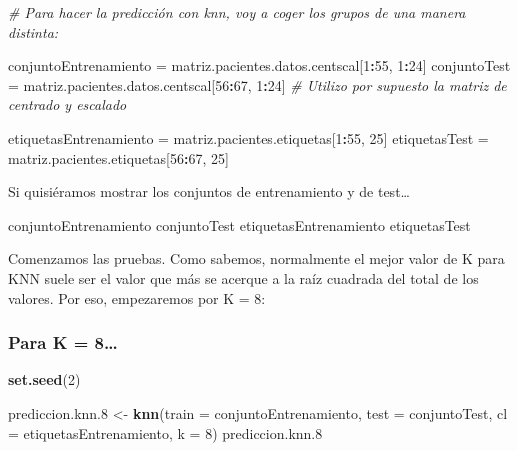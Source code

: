 \documentclass[]{article}
\newenvironment{Shaded}{\begin{snugshade}}{\end{snugshade}}
\newcommand{\KeywordTok}[1]{\textcolor[rgb]{0.13,0.29,0.53}{\textbf{#1}}}
\newcommand{\DataTypeTok}[1]{\textcolor[rgb]{0.13,0.29,0.53}{#1}}
\newcommand{\DecValTok}[1]{\textcolor[rgb]{0.00,0.00,0.81}{#1}}
\newcommand{\StringTok}[1]{\textcolor[rgb]{0.31,0.60,0.02}{#1}}
\newcommand{\CommentTok}[1]{\textcolor[rgb]{0.56,0.35,0.01}{\textit{#1}}}
\newcommand{\OperatorTok}[1]{\textcolor[rgb]{0.81,0.36,0.00}{\textbf{#1}}}
\newcommand{\NormalTok}[1]{#1}
\begin{document}
\begin{Shaded}
\begin{Highlighting}[]
\CommentTok{# Para hacer la predicción con knn, voy a coger los grupos de una manera distinta:}

\NormalTok{conjuntoEntrenamiento =}\StringTok{ }\NormalTok{matriz.pacientes.datos.centscal[}\DecValTok{1}\OperatorTok{:}\DecValTok{55}\NormalTok{, }\DecValTok{1}\OperatorTok{:}\DecValTok{24}\NormalTok{]}
\NormalTok{conjuntoTest =}\StringTok{ }\NormalTok{matriz.pacientes.datos.centscal[}\DecValTok{56}\OperatorTok{:}\DecValTok{67}\NormalTok{, }\DecValTok{1}\OperatorTok{:}\DecValTok{24}\NormalTok{] }\CommentTok{# Utilizo por supuesto la matriz de centrado y escalado}

\NormalTok{etiquetasEntrenamiento =}\StringTok{ }\NormalTok{matriz.pacientes.etiquetas[}\DecValTok{1}\OperatorTok{:}\DecValTok{55}\NormalTok{, }\DecValTok{25}\NormalTok{]}
\NormalTok{etiquetasTest =}\StringTok{ }\NormalTok{matriz.pacientes.etiquetas[}\DecValTok{56}\OperatorTok{:}\DecValTok{67}\NormalTok{, }\DecValTok{25}\NormalTok{]}
\end{Highlighting}
\end{Shaded}

Si quisiéramos mostrar los conjuntos de entrenamiento y de test\ldots{}

\begin{Shaded}
\begin{Highlighting}[]
\NormalTok{conjuntoEntrenamiento}
\NormalTok{conjuntoTest}
\NormalTok{etiquetasEntrenamiento}
\NormalTok{etiquetasTest}
\end{Highlighting}
\end{Shaded}

Comenzamos las pruebas. Como sabemos, normalmente el mejor valor de K
para KNN suele ser el valor que más se acerque a la raíz cuadrada del
total de los valores. Por eso, empezaremos por K = 8:

\subsubsection{Para K = 8\ldots{}}\label{para-k-8}

\begin{Shaded}
\begin{Highlighting}[]
\KeywordTok{set.seed}\NormalTok{(}\DecValTok{2}\NormalTok{)}

\NormalTok{prediccion.knn.}\DecValTok{8}\NormalTok{ <-}\StringTok{ }\KeywordTok{knn}\NormalTok{(}\DataTypeTok{train =}\NormalTok{ conjuntoEntrenamiento, }\DataTypeTok{test =}\NormalTok{ conjuntoTest, }\DataTypeTok{cl =}\NormalTok{ etiquetasEntrenamiento, }\DataTypeTok{k =} \DecValTok{8}\NormalTok{)}
\NormalTok{prediccion.knn.}\DecValTok{8}
\end{Highlighting}
\end{Shaded}
\end{document}
